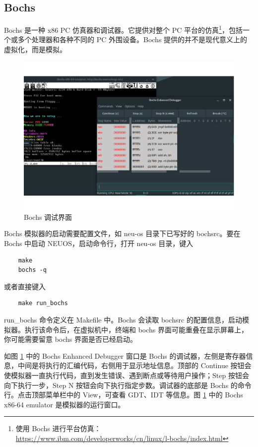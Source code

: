 \subsection{Bochs}

Bochs 是一种 x86 PC 仿真器和调试器。它提供对整个 PC 平台的仿真\footnote{使用 Bochs 进行平台仿真：\url{https://www.ibm.com/developerworks/cn/linux/l-bochs/index.html}}，包括一个或多个处理器和各种不同的 PC 外围设备。Bochs 提供的并不是现代意义上的虚拟化，而是模拟。

\begin{figure}[htbp]
    \centering
    \includegraphics[width=\textwidth]{img/Bochs调试界面.pdf}
    \caption{Bochs 调试界面}
    \label{fig:Bochs 调试界面}
\end{figure}

Bochs 模拟器的启动需要配置文件，如 neu-os 目录下已写好的 bochsrc。要在 Bochs 中启动 NEUOS，启动命令行，打开 neu-os 目录，键入

\begin{lstlisting}
    make
    bochs -q
\end{lstlisting}

或者直接键入

\begin{lstlisting}
    make run_bochs
\end{lstlisting}

run\_bochs 命令定义在 Makefile 中。Bochs 会读取 bochsrc 的配置信息，启动模拟器。执行该命令后，在虚拟机中，终端和 bochs 界面可能重叠在显示屏幕上，你可能需要留意 bochs 界面是否已经启动。

如图 \ref{fig:Bochs 调试界面} 中的 Bochs Enhanced Debugger 窗口是 Bochs 的调试器，左侧是寄存器信息，中间是将执行的汇编代码，右侧用于显示地址信息。顶部的 Continue 按钮会使模拟器一直执行代码，直到发生错误、遇到断点或等待用户操作；Step 按钮会向下执行一步，Step N 按钮会向下执行指定步数。调试器的底部是 Bochs 的命令行。点击顶部菜单栏中的 View，可查看 GDT、IDT 等信息。图 \ref{fig:Bochs 调试界面} 中的 Bochs x86-64 emulator 是模拟器的运行窗口。

